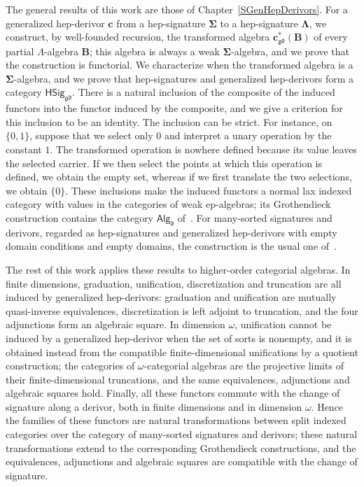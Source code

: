 \documentclass[a4paper, reqno]{amsbook}
\newcommand{\sig}[1]{\mathbf{#1}}             %
\newcommand{\gd}{\mathfrak{gd}}              %
\theoremstyle{plain}
\theoremstyle{definition}
\begin{document}
The general results of this work are those of Chapter~\ref{SGenHepDerivors}.
For a generalized hep-derivor $\mathbf{c}$ from a hep-signature $\sig{\Sigma}$ to a hep-signature $\sig{\Lambda}$, we construct, by well-founded recursion, the transformed algebra $\mathbf{c}^{\ast}_{\gd}(\mathbf{B})$ of every partial $\Lambda$-algebra $\mathbf{B}$; this algebra is always a weak $\sig{\Sigma}$-algebra, and we prove that the construction is functorial.
We characterize when the transformed algebra is a $\sig{\Sigma}$-algebra, and we prove that hep-signatures and generalized hep-derivors form a category $\mathsf{HSig}_{\gd}$.
There is a natural inclusion of the composite of the induced functors into the functor induced by the composite, and we give a criterion for this inclusion to be an identity.
The inclusion can be strict. For instance, on $\{0,1\}$, suppose that we select only $0$ and interpret a unary operation by the constant $1$.
The transformed operation is nowhere defined because its value leaves the selected carrier.
If we then select the points at which this operation is defined, we obtain the empty set, whereas if we first translate the two selections, we obtain $\{0\}$.
These inclusions make the induced functors a normal lax indexed category with values in the categories of weak ep-algebras; its Grothendieck construction contains the category $\mathsf{Alg}_{\mathfrak{d}}$ of~\cite{ClimentSoliveres2010b}.
For many-sorted signatures and derivors, regarded as hep-signatures and generalized hep-derivors with empty domain conditions and empty domains, the construction is the usual one of~\cite{ClimentSoliveres2010b}.

The rest of this work applies these results to higher-order categorial algebras.
In finite dimensions, graduation, unification, discretization and truncation are all induced by generalized hep-derivors: graduation and unification are mutually quasi-inverse equivalences, discretization is left adjoint to truncation, and the four adjunctions form an algebraic square.
In dimension $\omega$, unification cannot be induced by a generalized hep-derivor when the set of sorts is nonempty, and it is obtained instead from the compatible finite-dimensional unifications by a quotient construction; the categories of $\omega$-categorial algebras are the projective limits of their finite-dimensional truncations, and the same equivalences, adjunctions and algebraic squares hold.
Finally, all these functors commute with the change of signature along a derivor, both in finite dimensions and in dimension $\omega$. Hence the families of these functors are natural transformations between split indexed categories over the category of many-sorted signatures and derivors; these natural transformations extend to the corresponding Grothendieck constructions, and the equivalences, adjunctions and algebraic squares are compatible with the change of signature.
\end{document}
